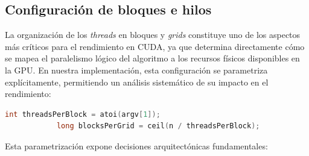     \subsection{Configuración de bloques e hilos}

        La organización de los \textit{threads} en bloques y \textit{grids} constituye uno de los aspectos más críticos para el rendimiento en CUDA, ya que determina directamente cómo se mapea el paralelismo lógico del algoritmo a los recursos físicos disponibles en la GPU. En nuestra implementación, esta configuración se parametriza explícitamente, permitiendo un análisis sistemático de su impacto en el rendimiento:

        \begin{lstlisting}[language=C, caption={Calculo de dimensiones de bloques y \textit{grid}.}, gobble=12]
            int threadsPerBlock = atoi(argv[1]);
            long blocksPerGrid = ceil(n / threadsPerBlock);
        \end{lstlisting}

        Esta parametrización expone decisiones arquitectónicas fundamentales:
        

